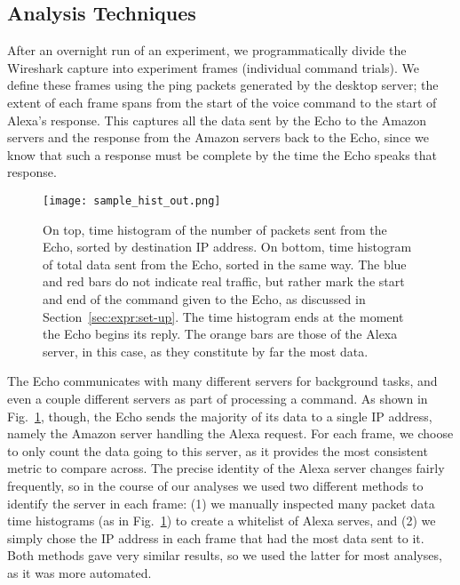 \subsection{Analysis Techniques}


After an overnight run of an experiment, we programmatically divide the Wireshark capture into experiment frames (individual command trials). We define these frames using the ping packets generated by the desktop server; the extent of each frame spans from the start of the voice command to the start of Alexa's response. This captures all the data sent by the Echo to the Amazon servers and the response from the Amazon servers back to the Echo, since we know that such a response must be complete by the time the Echo speaks that response.

\begin{figure}[!t]
    \centering
    \texttt{[image: sample\_hist\_out.png]}
    \caption{On top, time histogram of the number of packets sent from the Echo, sorted by destination IP address. On bottom, time histogram of total data sent from the Echo, sorted in the same way. The blue and red bars do not indicate real traffic, but rather mark the start and end of the command given to the Echo, as discussed in Section~\ref{sec:expr:set-up}. The time histogram ends at the moment the Echo begins its reply. The orange bars are those of the Alexa server, in this case, as they constitute by far the most data.}
    \label{fig:example_frame}
\end{figure}

The Echo communicates with many different servers for background tasks, and even a couple different servers as part of processing a command. As shown in Fig.~\ref{fig:example_frame}, though, the Echo sends the majority of its data to a single IP address, namely the Amazon server handling the Alexa request. For each frame, we choose to only count the data going to this server, as it provides the most consistent metric to compare across. The precise identity of the Alexa server changes fairly frequently, so in the course of our analyses we used two different methods to identify the server in each frame: (1) we manually inspected many packet data time histograms (as in Fig.~\ref{fig:example_frame}) to create a whitelist of Alexa serves, and (2) we simply chose the IP address in each frame that had the most data sent to it. Both methods gave very similar results, so we used the latter for most analyses, as it was more automated.

